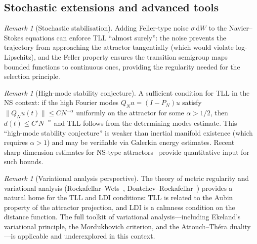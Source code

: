 \documentclass[12pt,a4paper]{article}
\theoremstyle{definition}
\theoremstyle{plain}
\theoremstyle{remark}
\newtheorem{remark}[definition]{Remark}
\begin{document}
\subsection{Stochastic extensions and advanced tools}

\begin{remark}[Stochastic stabilisation]
\label{rem:stochastic-stabilisation}
Adding Feller-type noise $\sigma\,\mathrm{d}W$ to the Navier--Stokes equations can enforce TLL ``almost surely'': the noise prevents the trajectory from approaching the attractor tangentially (which would violate log-Lipschitz), and the Feller property ensures the transition semigroup maps bounded functions to continuous ones, providing the regularity needed for the selection principle.
\end{remark}

\begin{remark}[High-mode stability conjecture]
\label{rem:high-mode-stability}
A sufficient condition for TLL in the NS context: if the high Fourier modes $Q_N u = (I - P_N) u$ satisfy $\|Q_N u(t)\| \leq C N^{-\alpha}$ uniformly on the attractor for some $\alpha > 1/2$, then $d(t) \leq C' N^{-\alpha}$ and TLL follows from the determining modes estimate. This ``high-mode stability conjecture'' is weaker than inertial manifold existence (which requires $\alpha > 1$) and may be verifiable via Galerkin energy estimates. Recent sharp dimension estimates for NS-type attractors~\cite{IlyinKalantarovZelik2025} provide quantitative input for such bounds.
\end{remark}

\begin{remark}[Variational analysis perspective]
\label{rem:variational-analysis}
The theory of metric regularity and variational analysis (Rockafellar--Wets~\cite{RockafellarWets1998}, Dontchev--Rockafellar~\cite{DontchevRockafellar2009}) provides a natural home for the TLL and LDI conditions: TLL is related to the Aubin property of the attractor projection, and LDI is a calmness condition on the distance function. The full toolkit of variational analysis---including Ekeland's variational principle, the Mordukhovich criterion, and the Attouch--Th\'era duality---is applicable and underexplored in this context.
\end{remark}

\end{document}
